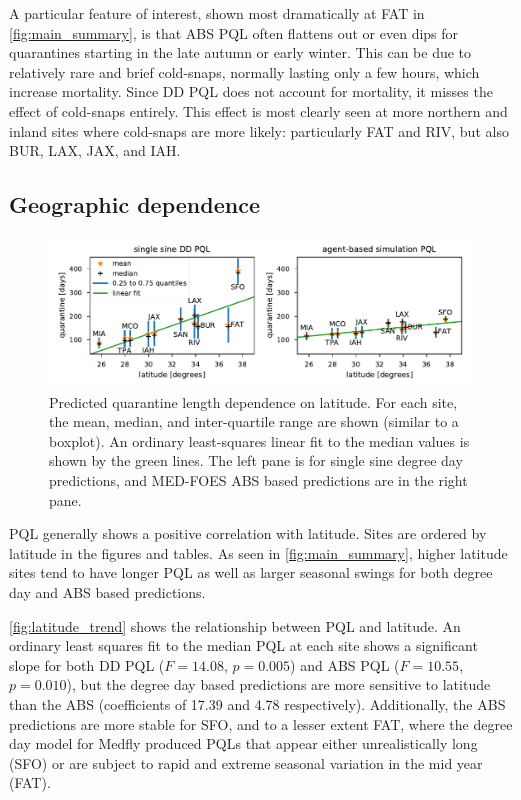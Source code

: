 \documentclass[10pt,a4paper,twocolumn]{article}
\begin{document}
A particular feature of interest, shown most dramatically at FAT in \autoref{fig:main_summary},
is that ABS PQL often flattens out or even dips for quarantines starting in the late 
autumn or early winter.  This can be due to relatively rare and brief cold-snaps,
normally lasting only a few hours, which increase mortality.
Since DD PQL does not account for mortality, it misses the effect of cold-snaps entirely.
This effect is most clearly seen at more northern and 
inland sites where cold-snaps are more likely: 
particularly FAT and RIV, but also BUR, LAX, JAX, and IAH.

\subsection*{Geographic dependence}

\begin{figure}[ht!]
\centering
\includegraphics{figs/fig_latitude_trend_withSFO.pdf}
\caption{\label{fig:latitude_trend} Predicted quarantine length dependence on latitude.
For each site, the mean, median, and inter-quartile range are shown (similar to a boxplot).
An ordinary least-squares linear fit to the median values is shown by the green lines.
The left pane is for single sine degree day predictions,
and MED-FOES ABS based predictions are in the right pane.
}
\end{figure}

PQL generally shows a positive correlation with latitude\cite{??}.
Sites are ordered by latitude in the figures and tables.
As seen in \autoref{fig:main_summary}, higher latitude sites tend to have longer PQL 
as well as larger seasonal swings for both degree day and ABS based predictions.

\autoref{fig:latitude_trend} shows the relationship between PQL and latitude.
An ordinary least squares fit to the median PQL at each site shows a significant slope for
both DD PQL ($F{=}14.08$, $p{=}0.005$) and ABS PQL ($F{=}10.55$, $p{=}0.010$), but
the degree day based predictions are more sensitive to latitude than the ABS
(coefficients of 17.39 and 4.78 respectively).
Additionally, the ABS predictions are more stable for SFO, and to a lesser extent FAT, 
where the degree day model for Medfly produced PQLs that appear either unrealistically long (SFO) 
or are subject to rapid and extreme seasonal variation in the mid year (FAT).
\end{document}
